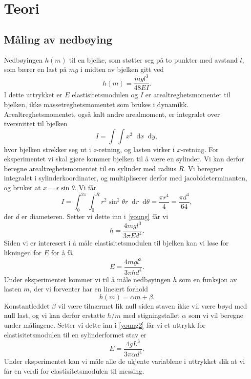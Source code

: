 \documentclass[%
 reprint,
 amsmath,amssymb,
 aps,
]{revtex4-1}
\newcommand*\diff{\mathop{}\!\mathrm{d}}
\begin{document}
\section{Teori}
\subsection{Måling av nedbøying}
Nedbøyingen $h(m)$ til en bjelke, som støtter seg på to punkter med avstand $l$, som bærer en last på $mg$ i midten av bjelken gitt ved
\begin{equation}
  h(m) = \frac{mgl^3}{48EI}.\label{young}
\end{equation}
I dette uttrykket er $E$ elastisitetsmodulen og $I$ er arealtreghetsmomentet til bjelken, ikke massetreghetsmomentet som brukes i dynamikk. Arealtreghetsmomentet, også kalt andre arealmoment, er integralet over tversnittet til bjelken
\begin{equation*}
  I = \int\int x^2 \diff x \diff y,
\end{equation*}hvor bjelken strekker seg ut i $z$-retning, og lasten virker i $x$-retning. For eksperimentet vi skal gjøre kommer bjelken til å være en sylinder. Vi kan derfor beregne arealtreghetsmomentet til en sylinder med radius $R$. Vi beregner integralet i sylinderkoordinater, og multipliserer derfor med jacobideterminanten, og bruker at $x = r\sin{\theta}$. Vi får
\begin{equation*}
  I = \int_0^{2\pi} \int_0^R r^2\sin^2{\theta}r \diff r \diff \theta = \frac{\pi r^4}{4} = \frac{\pi d^4}{64},
\end{equation*}
der $d$ er diameteren. Setter vi dette inn i \eqref{young} får vi
\begin{equation*}
  h = \frac{4mgl^3}{3\pi Ed^4}.
\end{equation*}
Siden vi er interesert i å måle elastisitetsmodulen til bjelken kan vi løse for likningen for $E$ for å få
\begin{equation}
  E = \frac{4mgl^3}{3\pi hd^4}. \label{young2}
\end{equation}
Under eksperimentet kommer vi til å måle nedbøyingen $h$ som en funksjon av lasten $m$, der vi forventer har en lineært forhold
\begin{equation*}
  h(m) = \alpha m + \beta.
\end{equation*}
Konstantleddet $\beta$ vil være tilnærmet lik null siden staven ikke vil være bøyd med null last, og vi kan derfor erstatte $h/m$ med stigningstallet $\alpha$ som vi vil beregne under målingene. Setter vi dette inn i \eqref{young2} får vi et uttrykk for elastisitetsmodulen til en sylinderformet stav er
\begin{equation}
  E = \frac{4gL^3}{3\pi \alpha d^4}. \label{young3}
\end{equation}
Under eksperimentet kan vi måle alle de ukjente variablene i uttrykket slik at vi får en verdi for elastisitetsmodulen til messing.
\end{document}
